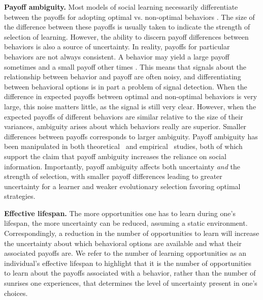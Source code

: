 \documentclass[letterpaper,11.5pt]{scrartcl}
\begin{document}
\textbf{Payoff ambiguity.} Most models of social learning necessarily differentiate between the payoffs for adopting optimal vs. non-optimal behaviors
\cite{BoydRicherson1985,Rogers1988,Enquist2007,Rendell2010,aoki2014evolution}. The size of the difference between
these payoffs is usually taken to indicate the strength of selection of learning. %
However, the ability to discern payoff differences between behaviors is also a source of uncertainty. In reality, payoffs for particular behaviors are not always consistent. A behavior may yield a large payoff sometimes and a small
payoff other times \cite{McElreath2005}. This means that signals about the
relationship between behavior and payoff are often noisy, and differentiating
between behavioral options is in part a problem of signal detection.  When the
difference in expected payoffs between optimal and non-optimal behaviors is very
large, this noise matters little, as the signal is still very clear. However, when
the expected payoffs of different behaviors are similar relative to the size of
their variances, ambiguity arises about which behaviors really are superior.
Smaller differences between payoffs corresponds to larger ambiguity. Payoff
ambiguity has been manipulated in both theoretical~\cite{perreault2012bayesian}
and empirical~\cite{McElreath2005, Morgan2012} studies, both of which support the
claim that payoff ambiguity increases the reliance on social information.
Importantly, payoff ambiguity %
affects both 
uncertainty \emph{and} the
strength of selection, with smaller payoff differences leading to greater uncertainty for a learner and weaker evolutionary selection favoring optimal strategies. %

\textbf{Effective lifespan.} 
The more opportunities one has to learn during one's lifespan, the more uncertainty can be reduced, assuming a
static environment. Correspondingly, a reduction in the number of opportunities to learn will increase the uncertainty about which behavioral options are available and what their associated
payoffs are. %
We refer to the number of learning opportunities as an individual's effective lifespan to highlight that it is the number of opportunities to learn about the payoffs associated with a behavior, rather than the number of sunrises one experiences, that determines the level of uncertainty present in one's choices.  
\end{document}
